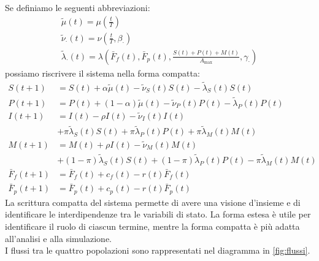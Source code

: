 Se definiamo le seguenti abbreviazioni:
\begin{gather*}
    \tilde\mu(t) = \mu\left(\frac{t}{T}\right) \\
    \tilde\nu_\cdot(t) = \nu\left(\frac{t}{T}, \beta_\cdot\right) \\
    \tilde\lambda_\cdot(t) = \lambda\left(\bar{F}_f(t), \bar{F}_p(t), \frac{S(t) + P(t) + M(t)}{A_{\max}}, \gamma_\cdot\right)
\end{gather*}
possiamo riscrivere il sistema nella forma compatta:
\begin{equation*}
    \begin{aligned}
        S(t+1) &= S(t)
            + \alpha \tilde\mu(t)
            - \tilde\nu_S(t) S(t)
            - \tilde\lambda_S(t) S(t) \\[10pt]
        P(t+1) &= P(t)
            + (1 - \alpha) \tilde\mu(t)
            - \tilde\nu_P(t) P(t)
            - \tilde\lambda_P(t) P(t) \\[10pt]
        I(t+1) &= I(t) 
            - \rho I(t)
            - \tilde\nu_I(t) I(t) \\
            &+ \pi \tilde\lambda_S(t) S(t)
            + \pi \tilde\lambda_P(t) P(t)
            + \pi \tilde\lambda_M(t) M(t) \\[10pt]
        M(t+1) &= M(t)
            + \rho I(t)
            - \tilde\nu_M(t) M(t) \\
            &+ (1 - \pi) \tilde\lambda_S(t) S(t)
            + (1 - \pi) \tilde\lambda_P(t) P(t)
            - \pi \tilde\lambda_M(t) M(t) \\[10pt]
        \bar{F}_f(t+1) &= \bar{F}_f(t)
            + c_f(t)
            - r(t) \bar{F}_f(t) \\[10pt]
        \bar{F}_p(t+1) &= \bar{F}_p(t)
            + c_p(t)
            - r(t) \bar{F}_p(t)
    \end{aligned}
\end{equation*}
La scrittura compatta del sistema permette di avere una visione d'insieme e di identificare le interdipendenze tra le variabili di stato. La forma estesa è utile per identificare il ruolo di ciascun termine, mentre la forma compatta è più adatta all'analisi e alla simulazione. \\
I flussi tra le quattro popolazioni sono rappresentati nel diagramma in \autoref{fig:flussi}.
